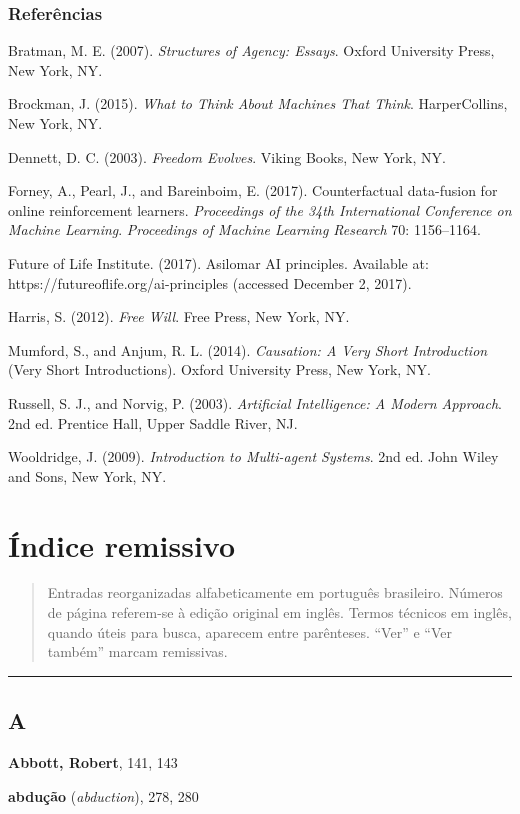 \documentclass[11pt,a5paper,twoside]{book}
\begin{document}
\subsection{Referências}
Bratman, M. E. (2007). \textit{Structures of Agency: Essays}. Oxford University Press, New York, NY.

Brockman, J. (2015). \textit{What to Think About Machines That Think}. HarperCollins, New York, NY.

Dennett, D. C. (2003). \textit{Freedom Evolves}. Viking Books, New York, NY.

Forney, A., Pearl, J., and Bareinboim, E. (2017). Counterfactual data-fusion for online reinforcement learners. \textit{Proceedings of the 34th International Conference on Machine Learning}. \textit{Proceedings of Machine Learning Research} 70: 1156–1164.

Future of Life Institute. (2017). Asilomar AI principles. Available at: https://futureoflife.org/ai-principles (accessed December 2, 2017).

Harris, S. (2012). \textit{Free Will}. Free Press, New York, NY.

Mumford, S., and Anjum, R. L. (2014). \textit{Causation: A Very Short Introduction} (Very Short Introductions). Oxford University Press, New York, NY.

Russell, S. J., and Norvig, P. (2003). \textit{Artificial Intelligence: A Modern Approach}. 2nd ed. Prentice Hall, Upper Saddle River, NJ.

Wooldridge, J. (2009). \textit{Introduction to Multi-agent Systems}. 2nd ed. John Wiley and Sons, New York, NY.

\chapter{Índice remissivo}
\begin{quote}
Entradas reorganizadas alfabeticamente em português brasileiro. Números de página referem-se à edição original em inglês. Termos técnicos em inglês, quando úteis para busca, aparecem entre parênteses. “Ver” e “Ver também” marcam remissivas.
\end{quote}
\vspace{1em}\hrule\vspace{1em}
\section{A}
\textbf{Abbott, Robert}, 141, 143

\textbf{abdução} (\textit{abduction}), 278, 280
\end{document}
